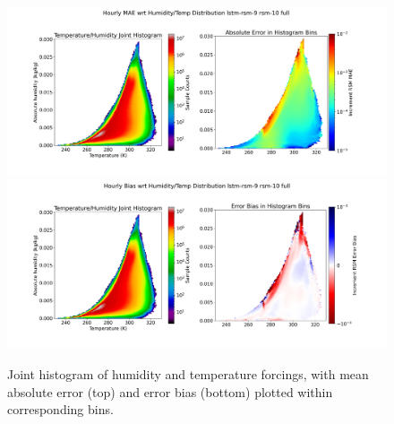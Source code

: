 \begin{figure}[hp!]
    \centering

    \includegraphics[width=.96\linewidth,draft=false]{figures/grid-eval_lstm-rsm-9_full/eval-grid_full_lstm-rsm-9_rsm-10_hist-humidity-temp_abs-err.png}
    \includegraphics[width=.96\linewidth,draft=false]{figures/grid-eval_lstm-rsm-9_full/eval-grid_full_lstm-rsm-9_rsm-10_hist-humidity-temp_bias.png}

    \caption{Joint histogram of humidity and temperature forcings, with mean absolute error (top) and error bias (bottom) plotted within corresponding bins.}
    \label{acclstm-rsm-9-hthist}
\end{figure}

